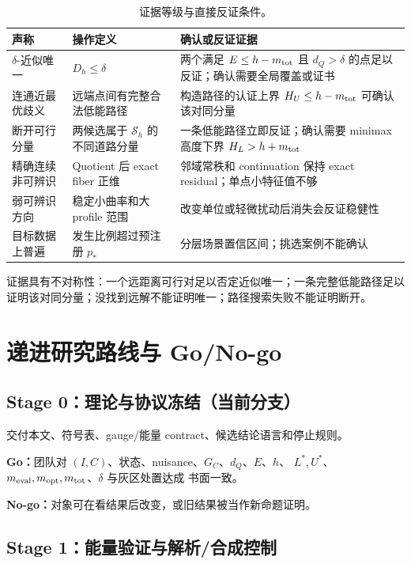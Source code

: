 \documentclass[UTF8,a4paper,11pt]{ctexart}
\newcommand{\Sset}{\mathcal S}
\begin{document}
\begin{table}[htbp]
\centering
\footnotesize
\begin{tabularx}{\textwidth}{>{\raggedright\arraybackslash}p{}
>{\raggedright\arraybackslash}p{}X}
\toprule
声称 & 操作定义 & 确认或反证证据\\
\midrule
$\delta$-近似唯一
  & $D_h\le\delta$
  & 两个满足 $E\le h-m_{\rm tot}$ 且 $d_Q>\delta$ 的点足以反证；确认需要全局覆盖或证书\\
连通近最优歧义
  & 远端点间有完整合法低能路径
  & 构造路径的认证上界 $H_U\le h-m_{\rm tot}$ 可确认该对同分量\\
断开可行分量
  & 两候选属于 $\Sset_h$ 的不同道路分量
  & 一条低能路径立即反证；确认需要 minimax 高度下界 $H_L>h+m_{\rm tot}$\\
精确连续非可辨识
  & Quotient 后 exact fiber 正维
  & 邻域常秩和 continuation 保持 exact residual；单点小特征值不够\\
弱可辨识方向
  & 稳定小曲率和大 profile 范围
  & 改变单位或轻微扰动后消失会反证稳健性\\
目标数据上普遍
  & 发生比例超过预注册 $p_*$
  & 分层场景置信区间；挑选案例不能确认\\
\bottomrule
\end{tabularx}
\caption{证据等级与直接反证条件。}
\end{table}

证据具有不对称性：一个远距离可行对足以否定近似唯一；一条完整低能路径足以
证明该对同分量；没找到远解不能证明唯一；路径搜索失败不能证明断开。

\section{递进研究路线与 Go/No-go}

\subsection{Stage 0：理论与协议冻结（当前分支）}

交付本文、符号表、gauge/能量 contract、候选结论语言和停止规则。

\textbf{Go：}团队对 $(I,C)$、状态、nuisance、$G_C$、$d_Q$、$E$、$h$、
$L^*,U^*$、$m_{\rm eval},m_{\rm opt},m_{\rm tot}$、$\delta$ 与灰区处置达成
书面一致。

\textbf{No-go：}对象可在看结果后改变，或旧结果被当作新命题证明。

\subsection{Stage 1：能量验证与解析/合成控制}
\end{document}
